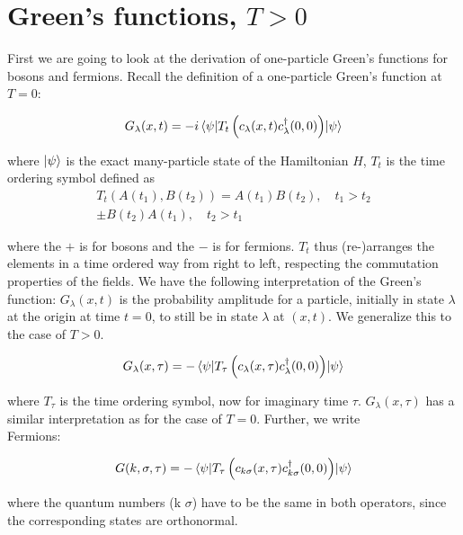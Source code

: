 \section{Green's functions, $T > 0$}
First we are going to look at the derivation of one-particle Green's functions for bosons and fermions. Recall the definition of a one-particle Green's function at $T = 0$: 

\begin{equation*}
    G_\lambda (x,t) = -i \mel{\psi}{T_t\left(c_\lambda(x,t)c_\lambda^{\dagger}(0,0)\right)}{\psi}
\end{equation*}

where $\ket{\psi}$ is the exact many-particle state of the Hamiltonian $H$, $T_t$ is the time ordering symbol defined as 
\begin{align*}
    T_t(A(t_1), B(t_2)) = A(t_1)B(t_2), \quad t_1 > t_2 \\ 
    \pm B(t_2)A(t_1), \quad t_2 > t_1
\end{align*}

where the $+$ is for bosons and the $-$ is for fermions. $T_t$ thus (re-)arranges the elements in a time ordered way from right to left, respecting the commutation properties of the fields. We have the following interpretation of the Green's function: $G_\lambda (x,t)$ is the probability amplitude for a particle, initially in state $\lambda$ at the origin at time $t = 0$, to still be in state $\lambda$ at $(x,t)$. We generalize this to the case of $T > 0$. 

\begin{equation*}
    G_\lambda (x,\tau) = -\mel{\psi}{T_\tau \left(c_\lambda(x,\tau)c_\lambda^{\dagger}(0,0)\right)}{\psi}
\end{equation*}

where $T_\tau$ is the time ordering symbol, now for imaginary time $\tau$. $G_\lambda (x,\tau)$ has a similar interpretation as for the case of $T = 0$. Further, we write \\

Fermions: 

\begin{equation*}
    G(k, \sigma, \tau) = -\mel{\psi}{T_\tau \left(c_{k\sigma}(x,\tau)c_{k\sigma}^{\dagger}(0,0)\right)}{\psi}
\end{equation*}

where the quantum numbers (k $\sigma$) have to be the same in both operators, since the corresponding states are orthonormal. \\


